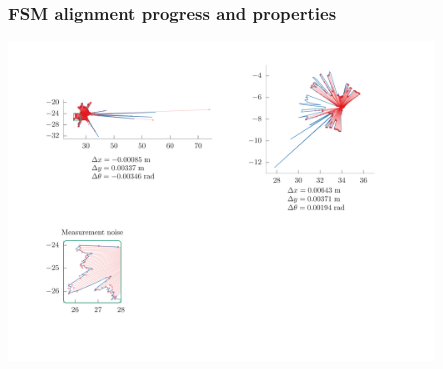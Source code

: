 \begin{frame}[noframenumbering]

  \frametitle{FSM alignment progress and properties}

  \begin{center}
    \includegraphics[height=240pt,width=320pt]{./figures/translation_and_rotation/all_fig12.png}
  \end{center}

\end{frame}
